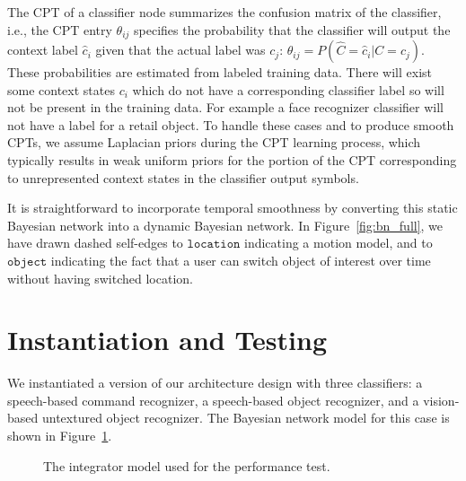 \documentclass{llncs}
\begin{document}
The CPT of a classifier node summarizes the confusion matrix of the
classifier, i.e., the CPT entry $\theta_{ij}$ specifies the
probability that the classifier will output the context label
$\hat{c}_i$ given that the actual label was $c_j$:
$\theta_{ij}=P(\hat{C}=\hat{c}_i|C=c_j)$.  These probabilities are
estimated from labeled training data. There will exist
some context states $c_i$ which do not have a corresponding classifier
label so will not be present in the training data.  For example a face
recognizer classifier will not have a label for a retail object. To
handle these cases and to produce smooth CPTs, we assume Laplacian
priors during the CPT learning process, which typically results in
weak uniform priors for the portion of the CPT corresponding to
unrepresented context states in the classifier output symbols. 

It is straightforward to incorporate temporal smoothness by converting this static
Bayesian network into a dynamic Bayesian network. In
Figure~\ref{fig:bn_full}, we have drawn dashed self-edges to $\texttt{location}$
indicating a motion model, and to $\texttt{object}$ indicating the fact that a
user can switch object of interest over time without having switched
location.

\section{Instantiation and Testing}
We instantiated a version of our architecture design with three
classifiers: a speech-based command recognizer, a speech-based object
recognizer, and a vision-based untextured object recognizer.  The
Bayesian network model for this case is shown in
Figure~\ref{fig:bn_poc}.
\begin{figure}
\caption{The integrator model used for the performance test.}
\label{fig:bn_poc}
\end{figure}
\end{document}
